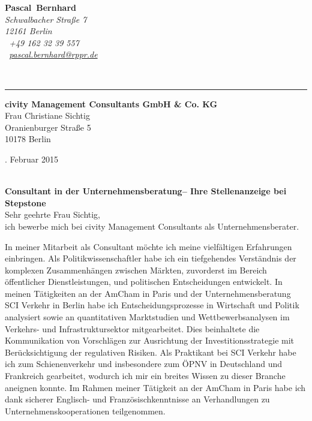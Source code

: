 \documentclass[11pt,a4paper]{article}
\def\firstname{Pascal}
\def\familyname{Bernhard}
\begin{document}
\sffamily   %
\hfill%
\begin{minipage}[t]{.6\textwidth}
	\raggedleft%
	{\bfseries {\color{firstnamecolor}\firstname}~{\color{familynamecolor}\familyname}}\\[.35ex]
	\small\itshape%
	Schwalbacher Straße 7\\
	12161 Berlin\\[.35ex]
	\Mobilefone~+49 162 32 39 557 \\
	\Letter~\href{mailto:pascal.bernhard@rppr.de}{pascal.bernhard@rppr.de}
\end{minipage}\\[0.5em]
%
{\color{firstnamecolor}\rule{\textwidth}{.25ex}}
%
\begin{minipage}[t]{.4\textwidth}
	\raggedright%
	\vspace*{1em}
	\textbf{civity Management Consultants GmbH \& Co. KG} \\
	Frau Christiane Sichtig \\[.35ex]
	\small%
	Oranienburger Straße 5\\
	10178 Berlin
\end{minipage}
%
\hfill
%
\begin{minipage}[t]{.4\textwidth}
	. Februar 2015
\end{minipage}\\[1em]


{\bfseries \color{familynamecolor}Consultant in der Unternehmensberatung-- Ihre Stellenanzeige bei Stepstone}\\[0.75em]

Sehr geehrte Frau Sichtig,\\[0.5em]
%
ich bewerbe mich bei civity Management Consultants als Unternehmensberater.

In meiner Mitarbeit als Consultant möchte ich meine vielfältigen Erfahrungen einbringen. Als Politikwissenschaftler habe ich ein tiefgehendes Verständnis der komplexen Zusammenhängen zwischen Märkten, zuvorderst im Bereich öffentlicher Dienstleistungen, und politischen Entscheidungen entwickelt. In meinen Tätigkeiten an der AmCham in Paris und der Unternehmensberatung SCI Verkehr in Berlin habe ich Entscheidungsprozesse in Wirtschaft und Politik analysiert sowie an quantitativen Marktstudien und Wettbewerbsanalysen im Verkehrs- und Infrastruktursektor mitgearbeitet. Dies beinhaltete die Kommunikation von Vorschlägen zur Ausrichtung der Investitionsstrategie mit Berücksichtigung der regulativen Risiken. Als Praktikant bei SCI Verkehr habe ich zum Schienenverkehr und insbesondere zum ÖPNV in Deutschland und Frankreich gearbeitet, wodurch ich mir ein breites Wissen zu dieser Branche aneignen konnte. Im Rahmen meiner Tätigkeit an der AmCham in Paris habe ich dank sicherer Englisch- und Französischkenntnisse an Verhandlungen zu Unternehmenskooperationen teilgenommen. 
\end{document}
